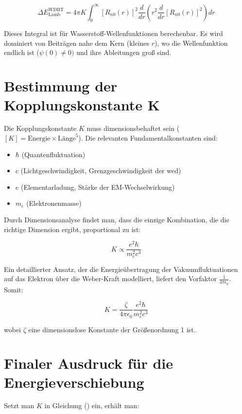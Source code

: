 \begin{equation}
    \Delta E_{\text{Lamb}}^{\text{WDBT}} = 4\pi K \int_0^\infty [R_{n0}(r)]^2 \frac{d}{dr} \left( r^2 \frac{d}{dr} [R_{n0}(r)]^2 \right) dr
\end{equation}

Dieses Integral ist für Wasserstoff-Wellenfunktionen berechenbar. Es wird dominiert von Beiträgen nahe dem Kern (kleines $r$), wo die Wellenfunktion endlich ist ($\psi(0) \neq 0)$ und ihre Ableitungen
groß sind.

\section{Bestimmung der Kopplungskonstante K}
Die Kopplungskonstante $K$ muss dimensionsbehaftet sein ($\left[ K \right] = \text{Energie} \times \text{Länge}^5$). Die relevanten Fundamentalkonstanten sind:

\begin{itemize}
    \item $\hbar$ (Quantenfluktuation)
    \item $c$ (Lichtgeschwindigkeit, Grenzgeschwindigkeit der \gls{wed})
    \item $e$ (Elementarladung, Stärke der EM-Wechselwirkung)
    \item $m_e$ (Elektronenmasse)
\end{itemize}

Durch Dimensionsanalyse findet man, dass die einzige Kombination, die die richtige Dimension ergibt, proportional zu ist:

\begin{equation}
    K \propto \frac{e^2 \hbar}{m_e^2 c^3}
\end{equation}

Ein detaillierter Ansatz, der die Energieübertragung der Vakuumfluktuationen auf das Elektron über die Weber-Kraft modelliert, liefert den Vorfaktor $\frac{1}{4 \pi \epsilon_0}$. Somit:

\begin{equation}
    K = \frac{\zeta}{4\pi\epsilon_0} \frac{e^2 \hbar}{m_e^2 c^3}
\end{equation}

wobei $\zeta$ eine dimensionslose Konstante der Größenordnung 1 ist.

\section{Finaler Ausdruck für die Energieverschiebung}
Setzt man $K$ in Gleichung () ein, erhält man:

